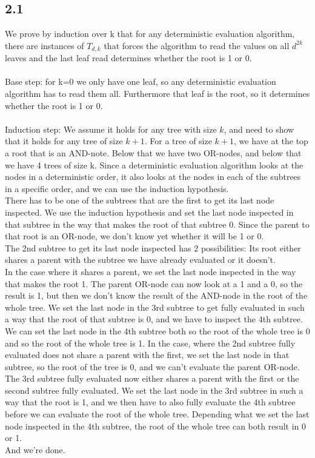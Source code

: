 \documentclass[12pt]{article}
\begin{document}
\subsection*{2.1}
We prove by induction over k that for any deterministic evaluation algorithm, there are instances of $T_{d,k}$ that forces the algorithm to read the values on all $d^{2k}$ leaves and the last leaf read determines whether the root is 1 or 0.\\
\\
Base step: for k=0 we only have one leaf, so any deterministic evaluation algorithm has to read them all. Furthermore that leaf is the root, so it determines whether the root is 1 or 0.\\
\\
Induction step: We assume it holds for any tree with size $k$, and need to show that it holds for any tree of size $k+1$. For a tree of size $k+1$, we have at the top a root that is an AND-note. Below that we have two OR-nodes, and below that we have 4 trees of size k. Since a deterministic evaluation algorithm looks at the nodes in a deterministic order, it also looks at the nodes in each of the subtrees in a specific order, and we can use the induction hypothesis.\\
There has to be one of the subtrees that are the first to get its last node inspected. We use the induction hypothesis and set the last node inspected in that subtree in the way that makes the root of that subtree 0. Since the parent to that root is an OR-node, we don't know yet whether it will be 1 or 0.\\
The 2nd subtree to get its last node inspected has 2 possibilities: Its root either shares a parent with the subtree we have already evaluated or it doesn't.\\
In the case where it shares a parent, we set the last node inspected in the way that makes the root 1. The parent OR-node can now look at a 1 and a 0, so the result is 1, but then we don't know the result of the AND-node in the root of the whole tree. We set the last node in the 3rd subtree to get fully evaluated in such a way that the root of that subtree is 0, and we have to inspect the 4th subtree. We can set the last node in the 4th subtree both so the root of the whole tree is 0 and so the root of the whole tree is 1.
In the case, where the 2nd subtree fully evaluated does not share a parent with the first, we set the last node in that subtree, so the root of the tree is 0, and we can't evaluate the parent OR-node. The 3rd subtree fully evaluated now either shares a parent with the first or the second subtree fully evaluated. We set the last node in the 3rd subtree in such a way that the root is 1, and we then have to also fully evaluate the 4th subtree before we can evaluate the root of the whole tree. Depending what we set the last node inspected in the 4th subtree, the root of the whole tree can both result in 0 or 1.\\
And we're done.
\end{document}
